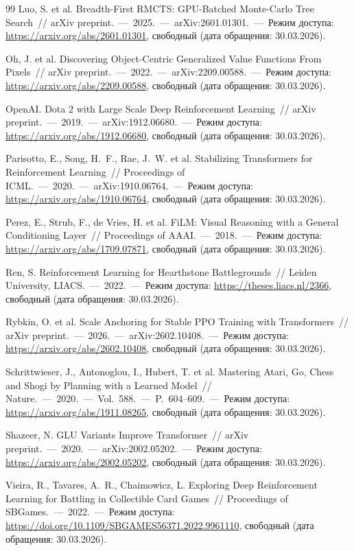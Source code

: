 \documentclass[a4paper,12pt]{extarticle}
\begin{document}
\begin{thebibliography}{99}
  Luo, S. et al. Breadth-First RMCTS: GPU-Batched Monte-Carlo Tree Search~// arXiv preprint.~---~2025.~---~arXiv:2601.01301.~---~Режим доступа: \url{https://arxiv.org/abs/2601.01301}, свободный (дата обращения: 30.03.2026).


  Oh, J. et al. Discovering Object-Centric Generalized Value Functions From Pixels~// arXiv preprint.~---~2022.~---~arXiv:2209.00588.~---~Режим доступа: \url{https://arxiv.org/abs/2209.00588}, свободный (дата обращения: 30.03.2026).

  OpenAI. Dota 2 with Large Scale Deep Reinforcement Learning~// arXiv preprint.~---~2019.~---~arXiv:1912.06680.~---~Режим доступа: \url{https://arxiv.org/abs/1912.06680}, свободный (дата обращения: 30.03.2026).

  Parisotto, E., Song, H.~F., Rae, J.~W. et al. Stabilizing Transformers for Reinforcement Learning~// Proceedings of ICML.~---~2020.~---~arXiv:1910.06764.~---~Режим доступа: \url{https://arxiv.org/abs/1910.06764}, свободный (дата обращения: 30.03.2026).

  Perez, E., Strub, F., de Vries, H. et al. FiLM: Visual Reasoning with a General Conditioning Layer~// Proceedings of AAAI.~---~2018.~---~Режим доступа: \url{https://arxiv.org/abs/1709.07871}, свободный (дата обращения: 30.03.2026).

  Ren, S. Reinforcement Learning for Hearthstone Battlegrounds~// Leiden University, LIACS.~---~2022.~---~Режим доступа: \url{https://theses.liacs.nl/2366}, свободный (дата обращения: 30.03.2026).

  Rybkin, O. et al. Scale Anchoring for Stable PPO Training with Transformers~// arXiv preprint.~---~2026.~---~arXiv:2602.10408.~---~Режим доступа: \url{https://arxiv.org/abs/2602.10408}, свободный (дата обращения: 30.03.2026).

  Schrittwieser, J., Antonoglou, I., Hubert, T. et al. Mastering Atari, Go, Chess and Shogi by Planning with a Learned Model~// Nature.~---~2020.~---~Vol.~588.~---~P.~604--609.~---~Режим доступа: \url{https://arxiv.org/abs/1911.08265}, свободный (дата обращения: 30.03.2026).

  Shazeer, N. GLU Variants Improve Transformer~// arXiv preprint.~---~2020.~---~arXiv:2002.05202.~---~Режим доступа: \url{https://arxiv.org/abs/2002.05202}, свободный (дата обращения: 30.03.2026).

  Vieira, R., Tavares, A.~R., Chaimowicz, L. Exploring Deep Reinforcement Learning for Battling in Collectible Card Games~// Proceedings of SBGames.~---~2022.~---~Режим доступа: \url{https://doi.org/10.1109/SBGAMES56371.2022.9961110}, свободный (дата обращения: 30.03.2026).


\end{thebibliography}
\end{document}
